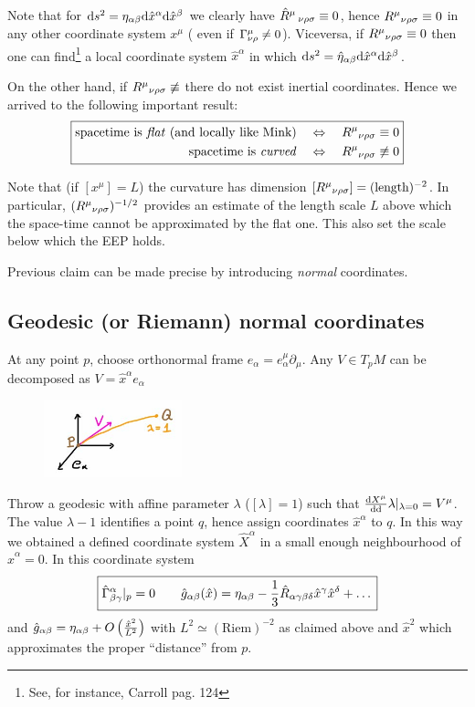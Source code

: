 \documentclass[../main/main.tex]{subfiles}
\begin{document}
Note that for $\textup{d} s^2=\eta_{\alpha\beta}\textup{d}\hat x^\alpha\textup{d}\hat x^\beta$ we clearly have ${{{{\hat R}}^{\mu}\,}}_{\nu \rho \sigma}\equiv0$, hence ${{R}^{\mu}}_{\nu \rho \sigma}\equiv0$ in any other coordinate system $x^\mu$ ( even if ${\Gamma}^{\mu}_{\nu \rho}\neq0$). Viceversa, if ${{R}^{\mu}}_{\nu \rho \sigma}\equiv0$ then one can find\footnote{See, for instance, Carroll pag. 124} a local coordinate system $\hat x^\alpha$ in which $\textup{d} s^2=\hat\eta_{\alpha\beta}\textup{d}\hat x^\alpha\textup{d}\hat x^\beta$. 

On the other hand, if ${{R}^{\mu}}_{\nu \rho \sigma}\not\equiv$ there do not exist inertial coordinates. Hence we arrived to the following important result:
\begin{equation}\boxed{\begin{split}
\text{spacetime is \emph{flat} (and locally like Mink)}\quad&\Leftrightarrow\quad{{R}^{\mu}}_{\nu \rho \sigma}\equiv0\\
\text{spacetime is \emph{curved}}\quad&\Leftrightarrow\quad{{R}^{\mu}}_{\nu \rho \sigma}\not\equiv0
\end{split}}\end{equation}

Note that (if $[x^\mu]=L$) the curvature has dimension $[{{R}^{\mu}}_{\nu \rho \sigma}]=(\text{length})^{-2}$. In particular, $({{R}^{\mu}}_{\nu \rho \sigma})^{-1/2}$ provides an estimate of the length scale $L$ above which the space-time cannot be approximated by the flat one. This also set the scale below which the EEP holds. 

Previous claim can be made precise by introducing \emph{normal} coordinates. 

\subsection{Geodesic (or Riemann) normal coordinates}

At any point $p$, choose orthonormal frame $e_\alpha=e_\alpha^\mu\partial_\mu$. Any $V\in T_pM$ can be decomposed as $V=\hat x^\alpha e_\alpha$
%
\begin{figure}[H]
\centering
\includegraphics[width=4cm]{../img/curv-norm-coord.jpg}
\end{figure}
\noindent
Throw a geodesic with affine parameter $\lambda$ ($[\lambda]=1$) such that $\frac{\textup{d} X^\mu}{\textup{d} \textup{d}}\lambda\vert_{\lambda=0}=V^\mu$. The value $\lambda-1$ identifies a point $q$, hence assign coordinates $\hat x^\alpha$ to $q$. In this way we obtained a defined coordinate system $\hat X^\alpha$ in a small enough neighbourhood of $\hat x^\alpha=0$. In this coordinate system
\begin{equation}\boxed{
{\hat\Gamma}^{\alpha}_{\beta \gamma}\vert_p=0\qquad\hat g_{\alpha\beta}(\hat x)=\eta_{\alpha\beta}-\frac13\hat R_{\alpha\gamma\beta\delta}\hat x^\gamma\hat x^\delta+\dots
}\end{equation}
and $\hat g_{\alpha\beta}=\eta_{\alpha\beta}+O\left(\frac{\hat x^2}{L^2}\right)$ with $L^2\simeq(\text{Riem})^{-2}$ as claimed above and $\hat x^2$ which approximates the proper ``distance'' from $p$. 
\end{document}
